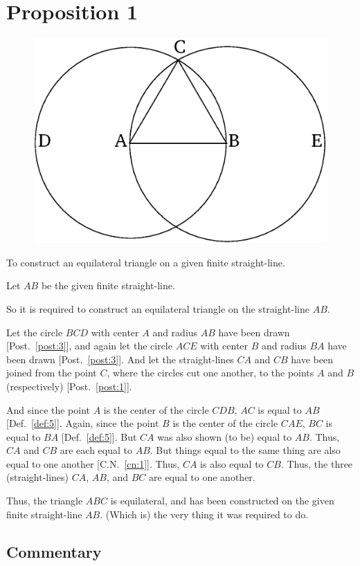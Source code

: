 \chapter*{Proposition 1}
\label{prop:1}

\begin{figure}[ht]
    \begin{center}
    \includegraphics[width=0.5\linewidth]{figures/fig01e.eps}
    \label{fig:prop_1}
    \end{center}
\end{figure}

To construct an equilateral triangle on a given finite straight-line.

Let $AB$ be the given finite straight-line. 

So it is required to construct an equilateral triangle on the straight-line $AB$.

Let the circle $BCD$ with center $A$ and radius $AB$ have been drawn [Post.~\ref{post:3}], and again let the circle $ACE$ with center $B$ and radius $BA$ have been drawn [Post.~\ref{post:3}].
And let the straight-lines $CA$ and $CB$ have been joined from the point $C$, where the circles cut one another, to the points $A$ and $B$ (respectively) [Post.~\ref{post:1}].

And since the point $A$ is the center of the circle $CDB$, $AC$ is equal to $AB$ [Def.~\ref{def:5}]. Again,
since the point $B$ is the center of the circle $CAE$, $BC$ is equal to $BA$ [Def.~\ref{def:5}]. But $CA$ 
was also shown (to be) equal to $AB$. Thus, $CA$ and $CB$ are each equal to $AB$. But things equal to the same thing are also equal to one another [C.N.~\ref{cn:1}]. Thus, $CA$ is also equal to $CB$. Thus, the three (straight-lines) $CA$, $AB$, and $BC$ are equal to one another.

Thus, the triangle $ABC$ is equilateral, and has been constructed on the
given finite straight-line $AB$. (Which is) the very thing it was required to do.

\section*{Commentary}

